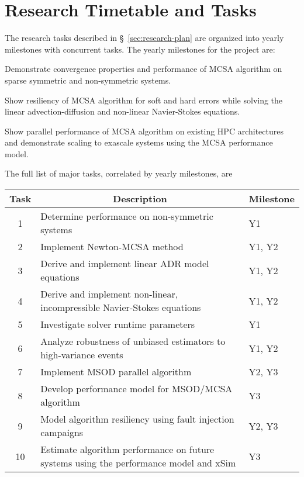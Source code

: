 \section{Research Timetable and Tasks}
\label{sec:rese-timet-tasks}

The research tasks described in \S~\ref{sec:research-plan} are organized into
yearly milestones with concurrent tasks.  The yearly milestones for the
project are:
\begin{description}
  \parskip=-2pt
\item[Year 1]

  Demonstrate convergence properties and performance of MCSA algorithm on
  sparse symmetric and non-symmetric systems.

\item[Year 2]

  Show resiliency of MCSA algorithm for soft and hard errors while solving the
  linear advection-diffusion and non-linear Navier-Stokes equations.

\item[Year 3]
  
  Show parallel performance of MCSA algorithm on existing HPC
  architectures and demonstrate scaling to exascale systems using the
  MCSA performance model.
\end{description}
The full list of major tasks, correlated by yearly milestones, are
\begin{center}
  \small
  \begin{tabular}{|c|p{3in}|l|}\hline 
    {\bf Task} & \multicolumn{1}{|c|}{\bf Description} &
    \multicolumn{1}{c|}{\bf Milestone} \\\hline
    1 & Determine performance on non-symmetric systems & Y1 \\\hline
    2 & Implement Newton-MCSA method & Y1, Y2 \\\hline
    3 & Derive and implement linear ADR model equations & Y1, Y2 \\\hline
    4 & Derive and implement non-linear, incompressible Navier-Stokes
    equations & Y1, Y2 \\\hline
    5 & Investigate solver runtime parameters & Y1 \\\hline
    6 & Analyze robustness of unbiased estimators to high-variance events &
    Y1, Y2 \\\hline
    7 & Implement MSOD parallel algorithm & Y2, Y3 \\\hline
    8 & Develop performance model for MSOD/MCSA algorithm & Y3 \\\hline
    9 & Model algorithm resiliency using fault injection campaigns & Y2, Y3 \\\hline
    10 & Estimate algorithm performance on future systems using the
    performance model and xSim & Y3 \\\hline 
  \end{tabular}
\end{center}

